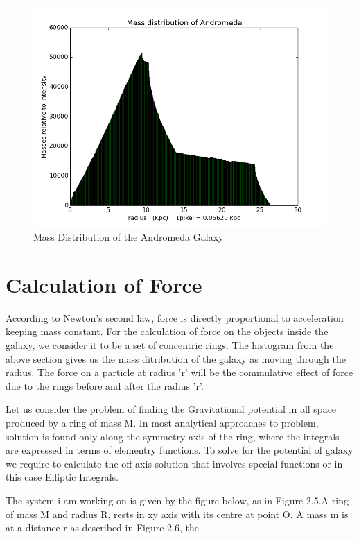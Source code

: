 \begin{enumerate}
\begin{verbatim}
\end{verbatim}

\begin{figure} [h]
\centering
\includegraphics[scale=0.45]{400}
\caption{Mass Distribution of the Andromeda Galaxy }
\end{figure}

\end{enumerate}

\section{Calculation of Force}

According to Newton's second law, force is directly proportional to acceleration keeping mass constant. For the calculation of force on the objects inside the galaxy, we consider it to be a set of concentric rings. The histogram from the above section gives us the mass ditribution of the galaxy as moving through the radius. The force on a particle at radius 'r' will be the commulative effect of force due to the rings before and after the radius 'r'.

Let us consider the problem of finding the Gravitational potential in all space produced by a ring of mass M. In most analytical approaches to problem, solution is found only along the symmetry axis of the ring, where the integrals are expressed in terms of elementry functions. To solve for the potential of galaxy we require to calculate the off-axis solution that involves special functions or in this case Elliptic Integrals.
 
The system i am working on is given by the figure below, as in Figure 2.5.A ring of mass M and radius R, rests in xy axis with its centre at point O. A mass m is at a distance r as described in Figure 2.6, the 

